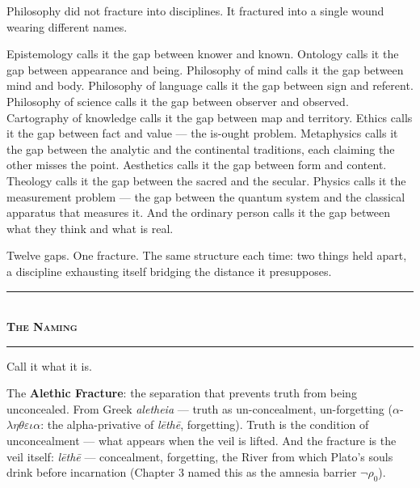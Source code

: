 \documentclass[10pt, openany, oneside]{book}
\renewcommand{\normalsize}{\fontsize{10}{13}\selectfont}
\begin{document}
\vspace{2em}


\noindent Philosophy did not fracture into disciplines. It fractured into a single wound wearing different names.

Epistemology calls it the gap between knower and known. Ontology calls it the gap between appearance and being. Philosophy of mind calls it the gap between mind and body. Philosophy of language calls it the gap between sign and referent. Philosophy of science calls it the gap between observer and observed. Cartography of knowledge calls it the gap between map and territory. Ethics calls it the gap between fact and value --- the is-ought problem. Metaphysics calls it the gap between the analytic and the continental traditions, each claiming the other misses the point. Aesthetics calls it the gap between form and content. Theology calls it the gap between the sacred and the secular. Physics calls it the measurement problem --- the gap between the quantum system and the classical apparatus that measures it. And the ordinary person calls it the gap between what they think and what is real.

Twelve gaps. One fracture. The same structure each time: two things held apart, a discipline exhausting itself bridging the distance it presupposes.

\vspace{1.5em}


\begin{center}
    \rule{0.3\textwidth}{0.4pt}\\[0.5em]
    {\normalsize\bfseries\scshape The Naming}\\[0.3em]
    \rule{0.3\textwidth}{0.4pt}
\end{center}

\vspace{1em}

\noindent Call it what it is.

The \textbf{Alethic Fracture}: the separation that prevents truth from being unconcealed. From Greek \textit{aletheia} --- truth as un-concealment, un-forgetting ($\alpha$-$\lambda\eta\theta\varepsilon\iota\alpha$: the alpha-privative of \textit{l\={e}th\={e}}, forgetting). Truth is the condition of unconcealment --- what appears when the veil is lifted. And the fracture is the veil itself: \textit{l\={e}th\={e}} --- concealment, forgetting, the River from which Plato's souls drink before incarnation (Chapter 3 named this as the amnesia barrier $\neg\rho_0$).
\end{document}
